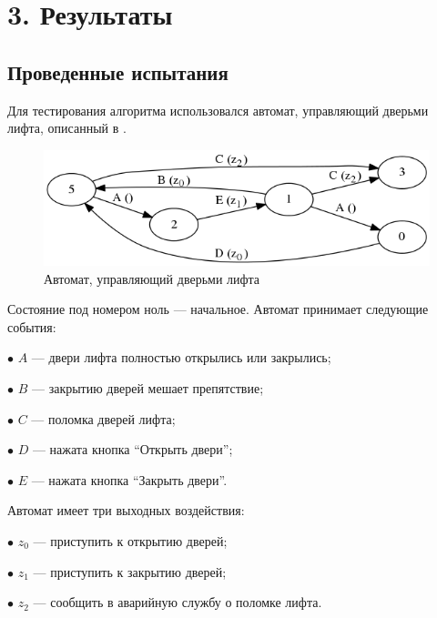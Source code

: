 \documentclass[12pt,fleqn]{article}
\begin{document}
\section{3. Результаты}

\subsection{Проведенные испытания}

Для тестирования алгоритма использовался автомат, управляющий дверьми лифта, описанный в \cite[Sec 2.3.1]{eg}.

\begin{figure}[!hb]
  \centering
    \includegraphics[scale=0.5]{lift.png}
  \caption{Автомат, управляющий дверьми лифта}
\end{figure}

Состояние под номером ноль --- начальное. Автомат принимает следующие события:

$\bullet$ $A$ --- двери лифта полностью открылись или закрылись;

$\bullet$ $B$ --- закрытию дверей мешает препятствие;

$\bullet$ $C$ --- поломка дверей лифта;

$\bullet$ $D$ --- нажата кнопка ``Открыть двери'';

$\bullet$ $E$ --- нажата кнопка ``Закрыть двери''.

Автомат имеет три выходных воздействия:

$\bullet$ $z_0$ --- приступить к открытию дверей;

$\bullet$ $z_1$ --- приступить к закрытию дверей;

$\bullet$ $z_2$ --- сообщить в аварийную службу о поломке лифта.
\end{document}
